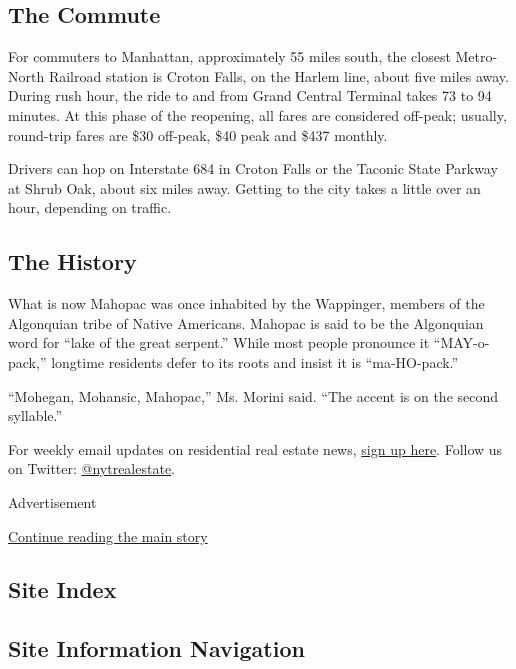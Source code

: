 \hypertarget{the-commute}{%
\subsection{The Commute}\label{the-commute}}

For commuters to Manhattan, approximately 55 miles south, the closest
Metro-North Railroad station is Croton Falls, on the Harlem line, about
five miles away. During rush hour, the ride to and from Grand Central
Terminal takes 73 to 94 minutes. At this phase of the reopening, all
fares are considered off-peak; usually, round-trip fares are \$30
off-peak, \$40 peak and \$437 monthly.

Drivers can hop on Interstate 684 in Croton Falls or the Taconic State
Parkway at Shrub Oak, about six miles away. Getting to the city takes a
little over an hour, depending on traffic.

\hypertarget{the-history}{%
\subsection{The History}\label{the-history}}

What is now Mahopac was once inhabited by the Wappinger, members of the
Algonquian tribe of Native Americans. Mahopac is said to be the
Algonquian word for ``lake of the great serpent.'' While most people
pronounce it ``MAY-o-pack,'' longtime residents defer to its roots and
insist it is ``ma-HO-pack.''

``Mohegan, Mohansic, Mahopac,'' Ms. Morini said. ``The accent is on the
second syllable.''

For weekly email updates on residential real estate news,
\href{http://www.nytimes3xbfgragh.onion/newsletters/realestate/}{sign up
here}. Follow us on Twitter:
\href{https://twitter.com/nytrealestate}{@nytrealestate}.

Advertisement

\protect\hyperlink{after-bottom}{Continue reading the main story}

\hypertarget{site-index}{%
\subsection{Site Index}\label{site-index}}

\hypertarget{site-information-navigation}{%
\subsection{Site Information
Navigation}\label{site-information-navigation}}

